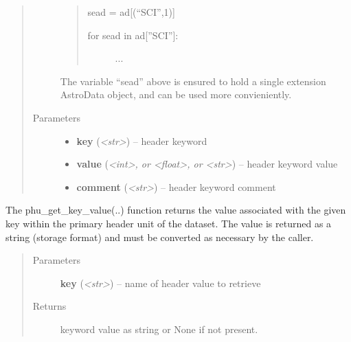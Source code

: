 \documentclass[letterpaper,10pt,english]{sphinxmanual}
\begin{document}
\begin{fulllineitems}
\begin{fulllineitems}
\begin{quote}
\begin{description}
\begin{quote}
sead = ad{[}(``SCI'',1){]}
\begin{description}
\item[{for sead in ad{[}''SCI''{]}:}] \leavevmode
...

\end{description}
\end{quote}

The variable ``sead'' above is ensured to hold a single extension
AstroData object, and can be used more convieniently.

\item[{Parameters}] \leavevmode\begin{itemize}
\item {} 
\textbf{key} (\emph{\textless{}str\textgreater{}}) -- header keyword

\item {} 
\textbf{value} (\emph{\textless{}int\textgreater{}, or \textless{}float\textgreater{}, or \textless{}str\textgreater{}}) -- header keyword value

\item {} 
\textbf{comment} (\emph{\textless{}str\textgreater{}}) -- header keyword comment

\end{itemize}

\end{description}\end{quote}

\end{fulllineitems}


\begin{fulllineitems}
\label{astro_class:astrodata.AstroData.AstroData.phu_get_key_value}
The phu\_get\_key\_value(..) function returns the value associated 
with the given key within the primary header unit of the dataset.
The value is returned as a string (storage format) and must be 
converted as necessary by the caller.
\begin{quote}\begin{description}
\item[{Parameters}] \leavevmode
\textbf{key} (\emph{\textless{}str\textgreater{}}) -- name of header value to retrieve

\item[{Returns}] \leavevmode
keyword value as string or None if not present.


\end{description}
\end{quote}
\end{fulllineitems}
\end{fulllineitems}
\end{document}

